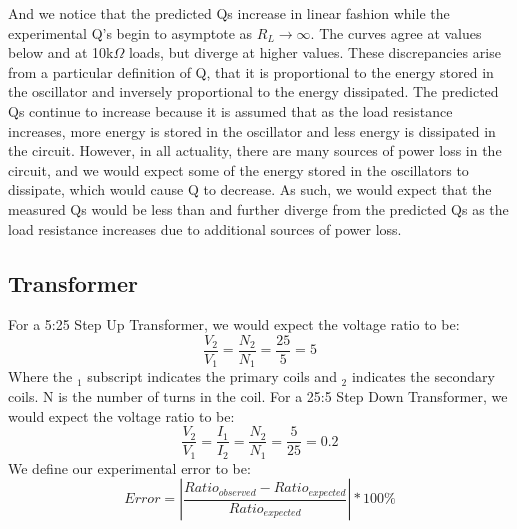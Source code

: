 \documentclass{article}
\begin{document}
    And we notice that the predicted Qs increase in linear fashion while the experimental Q's begin to asymptote as $R_L \rightarrow \infty$. The curves agree at values below and at 10k$\Omega$ loads, but diverge at higher values. These discrepancies arise from a particular definition of Q, that it is proportional to the energy stored in the oscillator and inversely proportional to the energy dissipated. The predicted Qs continue to increase because it is assumed that as the load resistance increases, more energy is stored in the oscillator and less energy is dissipated in the circuit. However, in all actuality, there are many sources of power loss in the circuit, and we would expect some of the energy stored in the oscillators to dissipate, which would cause Q to decrease. As such, we would expect that the measured Qs would be less than and further diverge from the predicted Qs as the load resistance increases due to additional sources of power loss.


\subsection{Transformer}
    For a 5:25 Step Up Transformer, we would expect the voltage ratio to be:
    \begin{equation}
        \frac{V_2}{V_1} = \frac{N_2}{N_1} = \frac{25}{5} = 5
    \end{equation}
    Where the $_1$ subscript indicates the primary coils and $_2$ indicates the secondary coils. N is the number of turns in the coil.
    For a 25:5 Step Down Transformer, we would expect the voltage ratio to be:
    \begin{equation}
        \frac{V_2}{V_1} = \frac{I_1}{I_2} = \frac{N_2}{N_1} = \frac{5}{25} = 0.2
    \end{equation}
    We define our experimental error to be:
    \begin{equation}
        Error = |\frac{Ratio_{observed}-Ratio_{expected}}{Ratio_{expected}}|*100\%
    \end{equation}
    
\end{document}
